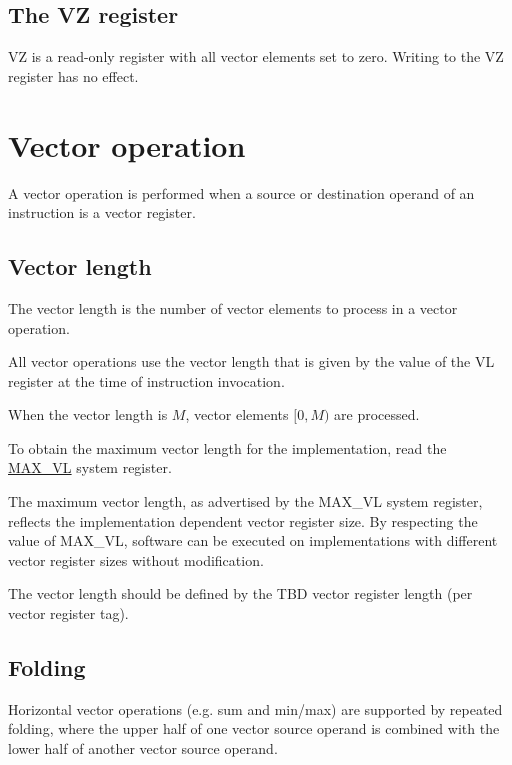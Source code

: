 \subsection{The VZ register}

VZ is a read-only register with all vector elements set to zero. Writing to the
VZ register has no effect.

\section{Vector operation}

A vector operation is performed when a source or destination operand of an
instruction is a vector register.

\subsection{Vector length}

The vector length is the number of vector elements to process in a vector
operation.

All vector operations use the vector length that is given by the value of the
VL register at the time of instruction invocation.

When the vector length is $M$, vector elements $[0, M)$ are processed.

To obtain the maximum vector length for the implementation, read the
\hyperref[reg:MAX_VL]{MAX\_VL} system register.

\begin{notebox}
  The maximum vector length, as advertised by the MAX\_VL system register,
  reflects the implementation dependent vector register size. By respecting the
  value of MAX\_VL, software can be executed on implementations with different
  vector register sizes without modification.
\end{notebox}

\begin{todobox}
  The vector length should be defined by the TBD vector register length (per
  vector register tag).
\end{todobox}

\subsection{Folding}

Horizontal vector operations (e.g. sum and min/max) are supported by repeated
folding, where the upper half of one vector source operand is combined with the
lower half of another vector source operand.

